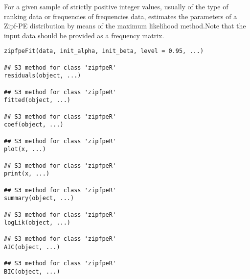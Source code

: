 \documentclass[letterpaper]{book}
\begin{document}
%
\begin{Description}\relax
For a given sample of strictly positive integer values,  usually of the type of ranking data or
frequencies of frequencies data, estimates the parameters of a Zipf-PE
distribution by means of the maximum likelihood method.Note that the input data
should be provided as a frequency matrix.
\end{Description}
%
\begin{Usage}
\begin{verbatim}
zipfpeFit(data, init_alpha, init_beta, level = 0.95, ...)

## S3 method for class 'zipfpeR'
residuals(object, ...)

## S3 method for class 'zipfpeR'
fitted(object, ...)

## S3 method for class 'zipfpeR'
coef(object, ...)

## S3 method for class 'zipfpeR'
plot(x, ...)

## S3 method for class 'zipfpeR'
print(x, ...)

## S3 method for class 'zipfpeR'
summary(object, ...)

## S3 method for class 'zipfpeR'
logLik(object, ...)

## S3 method for class 'zipfpeR'
AIC(object, ...)

## S3 method for class 'zipfpeR'
BIC(object, ...)
\end{verbatim}
\end{Usage}
%
\end{document}
